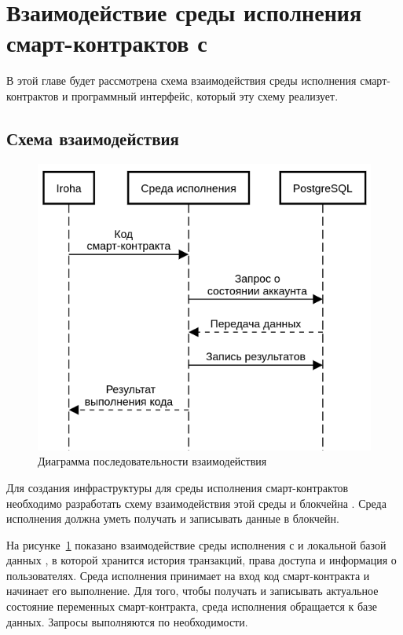 \section{Взаимодействие среды исполнения смарт-кон\-трак\-тов с }
В этой главе будет рассмотрена схема взаимодействия среды исполнения смарт-контрактов и программный интерфейс, который эту схему реализует.

\subsection{Схема взаимодействия}
\label{Interaction}

\begin{figure}[b!]
  \centering
  \includegraphics[width=0.6\columnwidth]{interaction.png}
  \caption{Диаграмма последовательности взаимодействия}
  \label{interaction}
\end{figure}

Для создания инфраструктуры для среды исполнения смарт-кон\-трак\-тов необходимо разработать схему взаимодействия этой среды и блокчейна .
Среда исполнения должна уметь получать и записывать данные в блокчейн.

На рисунке~\ref{interaction} показано взаимодействие среды исполнения с  и локальной базой данных , в которой хранится история транзакций, права доступа и информация о пользователях.
Среда исполнения принимает на вход код смарт-контракта и начинает его выполнение.
Для того, чтобы получать и записывать актуальное состояние переменных смарт-контракта, среда исполнения обращается к базе данных.
Запросы выполняются по необходимости.

